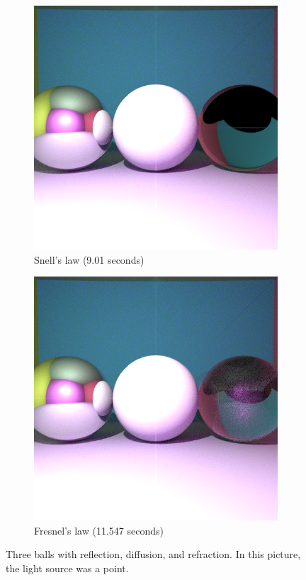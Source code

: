 \documentclass{amsart}
\begin{document}
\begin{figure}
     \centering
     \begin{subfigure}[b]{0.49\textwidth}
         \centering
         \includegraphics[width=\textwidth]{img/fig1_1.png}
         \caption{Snell's law (9.01 seconds)}
     \end{subfigure}
     \hfill
     \begin{subfigure}[b]{0.49\textwidth}
         \centering
         \includegraphics[width=\textwidth]{img/fig1_2.png}
         \caption{Fresnel's law (11.547 seconds)}
     \end{subfigure}
     \caption{Three balls with reflection, diffusion, and refraction. In this picture, the light source was a point.}
\end{figure}
\end{document}

